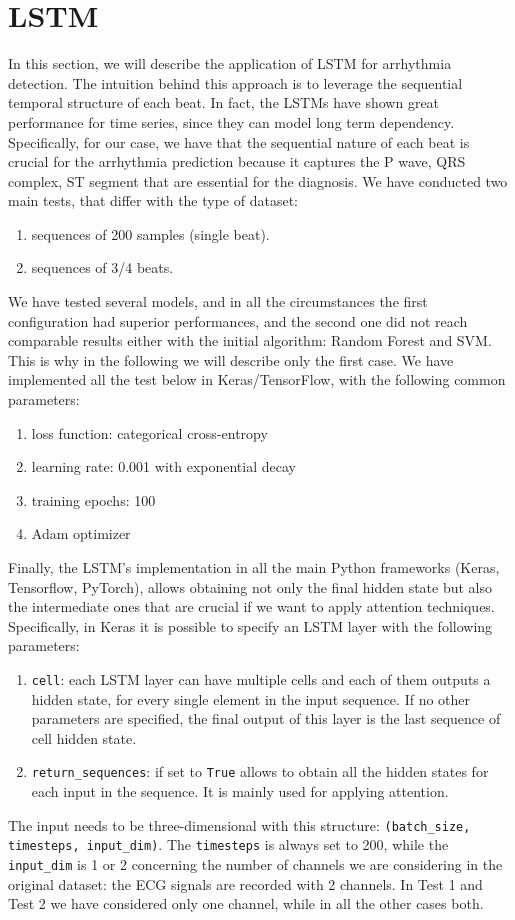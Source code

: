 \documentclass[LaM,binding=0.6cm]{sapthesis}
\begin{document}
\section{LSTM}
In this section, we will describe the application of LSTM for arrhythmia detection. The intuition behind this approach is to leverage the sequential temporal structure of each beat. In fact, the LSTMs have shown great performance for time series, since they can model long term dependency. Specifically, for our case, we have that the sequential nature of each beat is crucial for the arrhythmia prediction because it captures the P wave, QRS complex, ST segment that are essential for the diagnosis. We have conducted two main tests, that differ with the type of dataset: 
\begin{enumerate}
\item sequences of 200 samples (single beat).
\item sequences of 3/4 beats.
\end{enumerate}
We have tested several models, and in all the circumstances the first configuration had superior performances, and the second one did not reach comparable results either with the initial algorithm: Random Forest and SVM. This is why in the following we will describe only the first case. We have implemented all the test below in Keras/TensorFlow, with the following common parameters:
\begin{enumerate}
\item loss function: categorical cross-entropy
\item learning rate: 0.001 with exponential decay
\item training epochs: 100
\item Adam optimizer 
\end{enumerate}
Finally, the LSTM's implementation in all the main Python frameworks (Keras, Tensorflow, PyTorch), allows obtaining not only the final hidden state but also the intermediate ones that are crucial if we want to apply attention techniques. Specifically, in Keras it is possible to specify an LSTM layer with the following parameters:
\begin{enumerate}
\item \texttt{cell}: each LSTM layer can have multiple cells and each of them outputs a hidden state, for every single element in the input sequence. If no other parameters are specified, the final output of this layer is the last sequence of cell hidden state.
\item \texttt{return\_sequences}: if set to \texttt{True} allows to obtain all the hidden states for each input in the sequence. It is mainly used for applying attention.
\end{enumerate}
The input needs to be three-dimensional with this structure: \texttt{(batch\_size, timesteps, input\_dim)}. The \texttt{timesteps} is always set to 200, while the \texttt{input\_dim} is 1 or 2 concerning the number of channels we are considering in the original dataset: the ECG signals are recorded with 2 channels. In Test 1 and Test 2 we have considered only one channel, while in all the other cases both.
\end{document}
